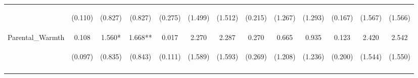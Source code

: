 \begin{tabular}{lcccccccccccc}
 & \begin{footnotesize}(0.110)\end{footnotesize} & \begin{footnotesize}(0.827)\end{footnotesize} & \begin{footnotesize}(0.827)\end{footnotesize} & \begin{footnotesize}(0.275)\end{footnotesize} & \begin{footnotesize}(1.499)\end{footnotesize} & \begin{footnotesize}(1.512)\end{footnotesize} & \begin{footnotesize}(0.215)\end{footnotesize} & \begin{footnotesize}(1.267)\end{footnotesize} & \begin{footnotesize}(1.293)\end{footnotesize} & \begin{footnotesize}(0.167)\end{footnotesize} & \begin{footnotesize}(1.567)\end{footnotesize} & \begin{footnotesize}(1.566)\end{footnotesize}\\
\noalign{\smallskip}Parental_Warmth & 0.108 & 1.560* & 1.668** & 0.017 & 2.270 & 2.287 & 0.270 & 0.665 & 0.935 & 0.123 & 2.420 & 2.542\\
 & \begin{footnotesize}(0.097)\end{footnotesize} & \begin{footnotesize}(0.835)\end{footnotesize} & \begin{footnotesize}(0.843)\end{footnotesize} & \begin{footnotesize}(0.111)\end{footnotesize} & \begin{footnotesize}(1.589)\end{footnotesize} & \begin{footnotesize}(1.593)\end{footnotesize} & \begin{footnotesize}(0.269)\end{footnotesize} & \begin{footnotesize}(1.208)\end{footnotesize} & \begin{footnotesize}(1.236)\end{footnotesize} & \begin{footnotesize}(0.200)\end{footnotesize} & \begin{footnotesize}(1.544)\end{footnotesize} & \begin{footnotesize}(1.550)\end{footnotesize}\\
\noalign{\smallskip}\hline\end{tabular}\\

